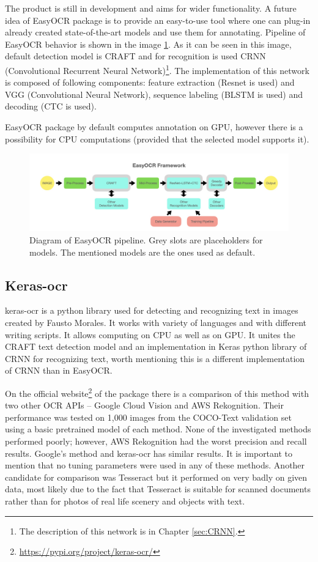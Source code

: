 The product is still in development and aims for wider functionality. A future idea of EasyOCR package is to provide an easy-to-use tool where one can plug-in already created state-of-the-art models and use them for annotating. Pipeline of EasyOCR behavior is shown in the image \ref*{img:easyocrPipeline}. As it can be seen in this image, default detection model is CRAFT and for recognition is used CRNN (Convolutional Recurrent Neural Network)\footnote{The description of this network is in Chapter \ref*{sec:CRNN}.}. The implementation of this network is composed of following components: feature extraction (Resnet is used) and VGG (Convolutional Neural Network), sequence labeling (BLSTM is used) and decoding (CTC is used).\cite{easyocr2}

EasyOCR package by default computes annotation on GPU, however there is a possibility for CPU computations (provided that the selected model supports it). 

\begin{figure}[hbtp]
    \centering
    \includegraphics[scale=0.4]{obrazky/easyocr_framework.jpeg}
    \caption{Diagram of EasyOCR pipeline. Grey slots are placeholders for models. The mentioned models are the ones used as default. \cite{easyocr2}}
    \label{img:easyocrPipeline}
\end{figure}

\subsection{Keras-ocr}

keras-ocr is a python library used for detecting and recognizing text in images created by Fausto Morales. It works with variety of languages and with different writing scripts. It allows computing on CPU as well as on GPU.  It unites the CRAFT text detection model and an implementation in Keras python library of CRNN for recognizing text, worth mentioning this is a different implementation of CRNN than in EasyOCR.\cite{keras-ocr1}

On the official website\footnote{\url{https://pypi.org/project/keras-ocr/}} of the package there is a comparison of this method with two other OCR APIs -- Google Cloud Vision and AWS Rekognition. Their performance was tested on 1,000 images from the COCO-Text validation set using a basic pretrained model of each method. None of the investigated methods performed poorly; however, AWS Rekognition had the worst precision and recall results. Google's method and keras-ocr has similar results. It is important to mention that no tuning parameters were used in any of these methods. Another candidate for comparison was Tesseract but it performed on very badly on given data, most likely due to the fact that Tesseract is suitable for scanned documents rather than for photos of real life scenery and objects with text. \cite{keras-ocr1}

